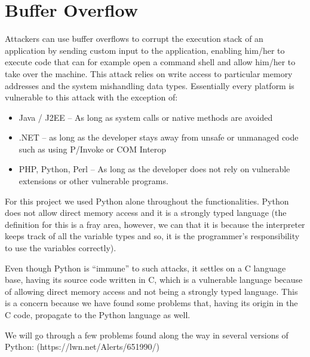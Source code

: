 \documentclass[11pt,a4paper]{report}
\begin{document}
\section{Buffer Overflow}

Attackers can use buffer overflows to corrupt the execution stack of an application by sending custom input to the application, enabling him/her to execute code that can for example open a command shell and allow him/her to take over the machine.
This attack relies on write access to particular memory addresses and the system mishandling data types.
Essentially every platform is vulnerable to this attack with the exception of:

\begin{itemize}
 \item Java / J2EE – As long as system calls or native methods are avoided
 \item .NET – as long as the developer stays away from unsafe or unmanaged code such as using P/Invoke or COM Interop
 \item PHP, Python, Perl – As long as the developer does not rely on vulnerable extensions or other vulnerable programs.
\end{itemize}

For this project we used Python alone throughout the functionalities. Python does not allow direct memory access and it is a strongly typed language (the definition for this is a fray area, however, we can that it is because the interpreter keeps track of all the variable types and so, it is the programmer’s responsibility to use the variables correctly).

Even though Python is “immune” to such attacks, it settles on a C language base, having its source code written in C, which is a vulnerable language because of allowing direct memory access and not being a strongly typed language. This is a concern because we have found some problems that, having its origin in the C code, propagate to the Python language as well.

We will go through a few problems found along the way in several versions of Python: (https://lwn.net/Alerts/651990/)
\end{document}
